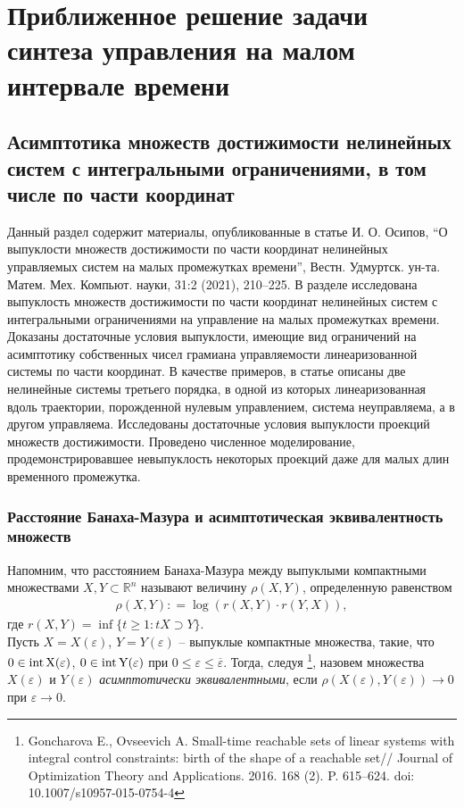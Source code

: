\documentclass[../main.tex]{subfiles}
\begin{document}
\newpage
\section{Приближенное решение задачи синтеза управления на малом интервале времени}
\subsection{Асимптотика множеств достижимости нелинейных систем с интегральными ограничениями, в том числе по части координат} 
Данный раздел содержит материалы, опубликованные в статье И. О. Осипов, “О выпуклости множеств достижимости по части координат нелинейных управляемых систем на малых промежутках времени”, Вестн. Удмуртск. ун-та. Матем. Мех. Компьют. науки, 31:2 (2021),  210–225. В разделе исследована выпуклость множеств достижимости по части координат нелинейных систем с интегральными ограничениями на управление на малых промежутках времени.
Доказаны достаточные условия выпуклости, имеющие вид ограничений на асимптотику собственных чисел грамиана управляемости линеаризованной системы по части координат.
В качестве примеров, в статье описаны две нелинейные системы третьего порядка, в одной из которых линеаризованная вдоль траектории, порожденной нулевым управлением, система неуправляема, а в другом управляема.
Исследованы достаточные условия выпуклости проекций множеств достижимости. 
Проведено численное моделирование, продемонстрировавшее невыпуклость некоторых проекций даже для малых длин временного промежутка.
\subsubsection{Расстояние Банаха-Мазура и асимптотическая эквивалентность множеств}
Напомним, что расстоянием Банаха-Мазура между выпуклыми компактными множествами $ X,Y \subset \mathbb R^n $ называют величину $ \rho (X, Y)  $, определенную равенством 
\begin{gather*}
	\rho (X, Y): = \log (r(X,Y) \cdot r(Y, X)),
\end{gather*}
где $r(X, Y) = \inf \{t \geq 1: tX \supset Y \}$.\\
Пусть $ X = X(\varepsilon) $,  $ Y = Y(\varepsilon) $ -- выпуклые компактные множества, такие, что $ 0 \in \rm{int}\,X(\varepsilon) $, $ 0 \in \rm{int}\,Y(\varepsilon) $ при $0 \leqslant \varepsilon \leqslant \overline{\varepsilon} $.  Тогда, следуя \footnote{Goncharova E., Ovseevich A. Small-time reachable sets of linear systems with integral control constraints: birth of the shape of a reachable set// Journal of Optimization Theory and Applications. 2016. 168 (2). P. 615--624.
	doi: 10.1007/s10957-015-0754-4}, назовем множества $  X(\varepsilon)  $ и $  Y(\varepsilon) $ {\it асимптотически эквивалентными}, если $  \rho (X(\varepsilon), Y(\varepsilon)) \rightarrow 0 $ при $\varepsilon \rightarrow 0 $.
\end{document}
